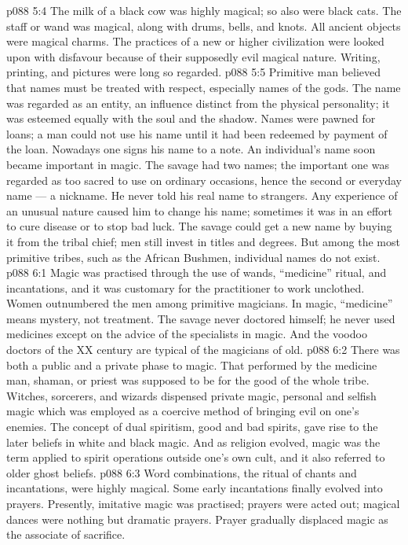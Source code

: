 \vs p088 5:4 The milk of a black cow was highly magical; so also were black cats. The staff or wand was magical, along with drums, bells, and knots. All ancient objects were magical charms. The practices of a new or higher civilization were looked upon with disfavour because of their supposedly evil magical nature. Writing, printing, and pictures were long so regarded.
\vs p088 5:5 Primitive man believed that names must be treated with respect, especially names of the gods. The name was regarded as an entity, an influence distinct from the physical personality; it was esteemed equally with the soul and the shadow. Names were pawned for loans; a man could not use his name until it had been redeemed by payment of the loan. Nowadays one signs his name to a note. An individual’s name soon became important in magic. The savage had two names; the important one was regarded as too sacred to use on ordinary occasions, hence the second or everyday name --- a nickname. He never told his real name to strangers. Any experience of an unusual nature caused him to change his name; sometimes it was in an effort to cure disease or to stop bad luck. The savage could get a new name by buying it from the tribal chief; men still invest in titles and degrees. But among the most primitive tribes, such as the African Bushmen, individual names do not exist.
\vs p088 6:1 Magic was practised through the use of wands, “medicine” ritual, and incantations, and it was customary for the practitioner to work unclothed. Women outnumbered the men among primitive magicians. In magic, “medicine” means mystery, not treatment. The savage never doctored himself; he never used medicines except on the advice of the specialists in magic. And the voodoo doctors of the XX century are typical of the magicians of old.
\vs p088 6:2 There was both a public and a private phase to magic. That performed by the medicine man, shaman, or priest was supposed to be for the good of the whole tribe. Witches, sorcerers, and wizards dispensed private magic, personal and selfish magic which was employed as a coercive method of bringing evil on one’s enemies. The concept of dual spiritism, good and bad spirits, gave rise to the later beliefs in white and black magic. And as religion evolved, magic was the term applied to spirit operations outside one’s own cult, and it also referred to older ghost beliefs.
\vs p088 6:3 Word combinations, the ritual of chants and incantations, were highly magical. Some early incantations finally evolved into prayers. Presently, imitative magic was practised; prayers were acted out; magical dances were nothing but dramatic prayers. Prayer gradually displaced magic as the associate of sacrifice.
